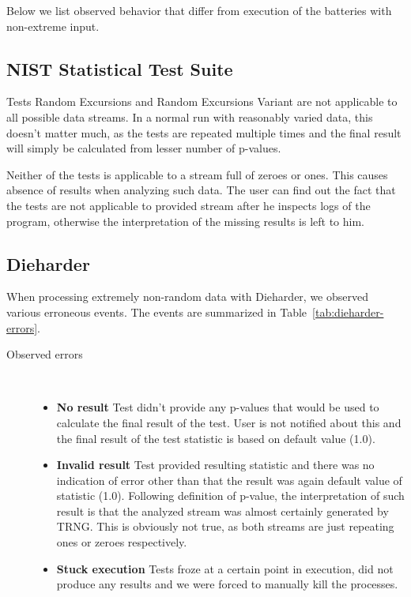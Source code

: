 \documentclass[
  digital,  	%
  color,		%
  oneside,   	%
  12pt,
  nocover,
  notable,
  nolof,
  nolot,
]{fithesis3}
\newenvironment{titlemize}[1]
{
	\begin{description}
	\item[#1]\
	\begin{itemize}
}
{
	\end{itemize}
 	\end{description}
}
\begin{document}
Below we list observed behavior that differ from execution of the batteries with non-extreme input.

\subsection*{NIST Statistical Test Suite}
Tests Random Excursions and Random Excursions Variant are not applicable to all possible data streams. In a normal run with reasonably varied data, this doesn't matter much, as the tests are repeated multiple times and the final result will simply be calculated from lesser number of p-values. 

Neither of the tests is applicable to a stream full of zeroes or ones. This causes absence of results when analyzing such data. The user can find out the fact that the tests are not applicable to provided stream after he inspects logs of the program, otherwise the interpretation of the missing results is left to him.

\subsection*{Dieharder}
When processing extremely non-random data with Dieharder, we observed various erroneous events. The events are summarized in Table~\ref{tab:dieharder-errors}. 

\begin{titlemize}{Observed errors}
\item \textbf{No result} Test didn't provide any p-values that would be used to calculate the final result of the test. User is not notified about this and the final result of the test statistic is based on default value (1.0).
\item \textbf{Invalid result} Test provided resulting statistic and there was no indication of error other than that the result was again default value of statistic (1.0). Following definition of p-value, the interpretation of such result is that the analyzed stream was almost certainly generated by TRNG. This is obviously not true, as both streams are just repeating ones or zeroes respectively. 
\item \textbf{Stuck execution} Tests froze at a certain point in execution, did not produce any results and we were forced to manually kill the processes.
\end{titlemize}
\end{document}
